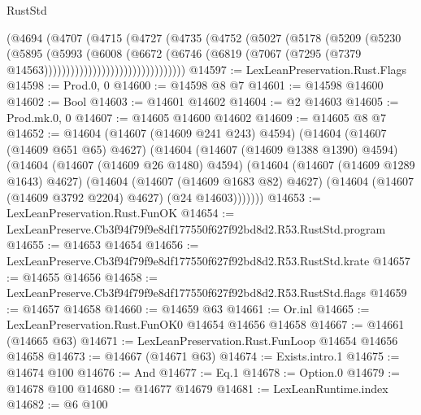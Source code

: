 \begin{lexlean}{RustStd}
\begin{coremodule}
                              (@4694
                                (@4707
                                  (@4715
                                    (@4727
                                      (@4735
                                        (@4752
                                          (@5027
                                            (@5178
                                              (@5209
                                                (@5230
                                                  (@5895
                                                    (@5993
                                                      (@6008
                                                        (@6672
                                                          (@6746
                                                            (@6819
                                                              (@7067
                                                                (@7295
                                                                  (@7379
                                                                    @14563))))))))))))))))))))))))))))))))
@14597 := LexLeanPreservation.Rust.Flags
@14598 := Prod.{0, 0}
@14600 := @14598 @8 @7
@14601 := @14598 @14600
@14602 := Bool
@14603 := @14601 @14602
@14604 := @2 @14603
@14605 := Prod.mk.{0, 0}
@14607 := @14605 @14600 @14602
@14609 := @14605 @8 @7
@14652 := @14604
    (@14607 (@14609 @241 @243) @4594)
    (@14604
      (@14607 (@14609 @651 @65) @4627)
      (@14604
        (@14607 (@14609 @1388 @1390) @4594)
        (@14604
          (@14607 (@14609 @26 @1480) @4594)
          (@14604
            (@14607 (@14609 @1289 @1643) @4627)
            (@14604
              (@14607 (@14609 @1683 @82) @4627)
              (@14604 (@14607 (@14609 @3792 @2204) @4627) (@24 @14603)))))))
@14653 := LexLeanPreservation.Rust.FunOK
@14654 := LexLeanPreserve.Cb3f94f79f9e8df177550f627f92bd8d2.R53.RustStd.program
@14655 := @14653 @14654
@14656 := LexLeanPreserve.Cb3f94f79f9e8df177550f627f92bd8d2.R53.RustStd.krate
@14657 := @14655 @14656
@14658 := LexLeanPreserve.Cb3f94f79f9e8df177550f627f92bd8d2.R53.RustStd.flags
@14659 := @14657 @14658
@14660 := @14659 @63
@14661 := Or.inl
@14665 := LexLeanPreservation.Rust.FunOK0 @14654 @14656 @14658
@14667 := @14661 (@14665 @63)
@14671 := LexLeanPreservation.Rust.FunLoop @14654 @14656 @14658
@14673 := @14667 (@14671 @63)
@14674 := Exists.intro.{1}
@14675 := @14674 @100
@14676 := And
@14677 := Eq.{1}
@14678 := Option.{0}
@14679 := @14678 @100
@14680 := @14677 @14679
@14681 := LexLeanRuntime.index
@14682 := @6 @100

\end{coremodule}
\end{lexlean}
